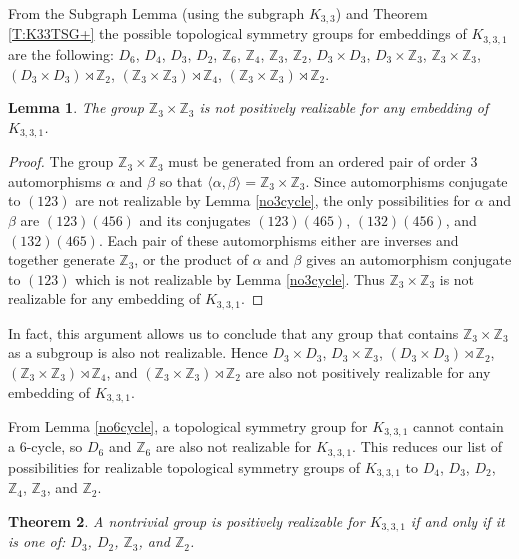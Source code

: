\documentclass[11]{amsart}
\def\Z{\mathbb{Z}}
\newcommand{\semi}{{\rtimes}}
\newtheorem{theorem}{Theorem}[section]
\newtheorem{lemma}[theorem]{Lemma}
\theoremstyle{definition}
\theoremstyle{remark}
\begin{document}

From the Subgraph Lemma (using the subgraph $K_{3,3}$) and Theorem \ref{T:K33TSG+} the possible topological symmetry groups for embeddings of $K_{3,3,1}$ are the following: $D_6$, $D_4$, $D_3$, $D_2$, $\mathbb{Z}_6$, $\Z_4$, $\mathbb{Z}_3$,  $\mathbb{Z}_2$, $D_3\times D_3$, $D_3 \times \mathbb{Z}_3$, $\mathbb{Z}_3 \times \mathbb{Z}_3$, $(D_3 \times D_3) \semi \Z_2$, $(\Z_3 \times \Z_3) \semi \Z_4$, $(\mathbb{Z}_3 \times \mathbb{Z}_3) \rtimes \mathbb{Z}_2$. 

 \begin{lemma}
 \label{Z3Z3}
   The group $\mathbb{Z}_3\times \mathbb{Z}_3$ is not positively realizable for any embedding of $K_{3,3,1}$.
\end{lemma}
    \begin{proof}
        The group $\mathbb{Z}_3 \times \mathbb{Z}_3$ must be generated from an ordered pair of order $3$ automorphisms $\alpha$ and $\beta$ so that $\langle \alpha,\beta \rangle = \mathbb{Z}_3 \times \mathbb{Z}_3$. Since automorphisms conjugate to $(123)$ are not realizable by Lemma \ref{no3cycle}, the only possibilities for $\alpha$ and $\beta$ are $(123)(456)$ and its conjugates $(123)(465)$, $(132)(456)$, and $(132)(465)$. Each pair of these automorphisms either are inverses and together generate $\mathbb{Z}_3$, or the product of $\alpha$ and $\beta$ gives an automorphism conjugate to $(123)$ which is not realizable by Lemma \ref{no3cycle}. Thus $\mathbb{Z}_3 \times \mathbb{Z}_3$ is not realizable for any embedding of $K_{3,3,1}$. 
    \end{proof}
    
In fact, this argument allows us to conclude that any group that contains $\Z_3 \times \Z_3$ as a subgroup is also not realizable. Hence $D_3\times D_3$, $D_3 \times \mathbb{Z}_3$, $(D_3 \times D_3) \semi \Z_2$, $(\Z_3 \times \Z_3) \semi \Z_4$, and $(\mathbb{Z}_3 \times \mathbb{Z}_3) \rtimes \mathbb{Z}_2$ are also not positively realizable for any embedding of $K_{3,3,1}$. 

From Lemma \ref{no6cycle}, a topological symmetry group for $K_{3,3,1}$ cannot contain a 6-cycle, so $D_6$ and $\Z_6$ are also not realizable for $K_{3,3,1}$.  This reduces our list of possibilities for realizable topological symmetry groups of $K_{3,3,1}$ to $D_4$, $D_3$, $D_2$, $\Z_4$, $\mathbb{Z}_3$, and $\mathbb{Z}_2$. 
   
    \begin{theorem}
\label{K331tsg}
            A nontrivial group is positively realizable for  $K_{3,3,1}$ if and only if it is one of: $D_3$, $D_2$, $\mathbb{Z}_3$, and $\mathbb{Z}_2$.
\end{theorem}
\end{document}
